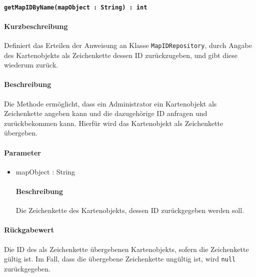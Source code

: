 \paragraph{\texttt{getMapIDByName(mapObject : String) : int}}%
\paragraph*{Kurzbeschreibung}
Definiert das Erteilen der Anweisung an Klasse \texttt{MapIDRepository}, durch Angabe des Kartenobjekts als Zeichenkette dessen ID zurückzugeben, und gibt diese wiederum zurück.
\paragraph*{Beschreibung}
Die Methode ermöglicht, dass ein Administrator ein Kartenobjekt als Zeichenkette angeben kann und die dazugehörige ID anfragen und zurückbekommen kann.
Hierfür wird das Kartenobjekt als Zeichenkette übergeben.
\paragraph*{Parameter}
\begin{itemize}
    \item mapObject : String
    		\paragraph*{Beschreibung}
    		Die Zeichenkette des Kartenobjekts, dessen ID zurückgegeben werden soll.
\end{itemize}
\paragraph*{Rückgabewert}
Die ID des als Zeichenkette übergebenen Kartenobjekts, sofern die Zeichenkette gültig ist.
Im Fall, dass die übergebene Zeichenkette ungültig ist, wird \texttt{null} zurückgegeben.
